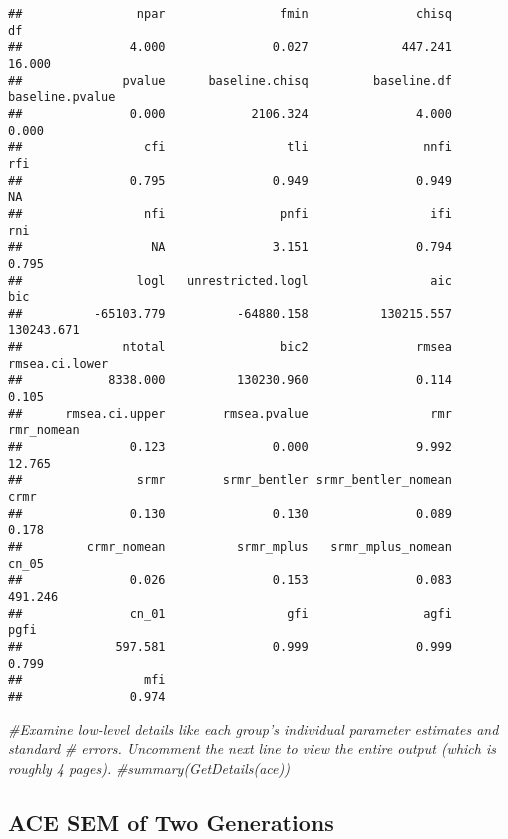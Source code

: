 \documentclass[smallextended]{svjour3}       %
\newenvironment{Shaded}{\begin{snugshade}}{\end{snugshade}}
\newcommand{\CommentTok}[1]{\textcolor[rgb]{0.56,0.35,0.01}{\textit{#1}}}
\begin{document}
\begin{verbatim}
##                npar                fmin               chisq                  df 
##               4.000               0.027             447.241              16.000 
##              pvalue      baseline.chisq         baseline.df     baseline.pvalue 
##               0.000            2106.324               4.000               0.000 
##                 cfi                 tli                nnfi                 rfi 
##               0.795               0.949               0.949                  NA 
##                 nfi                pnfi                 ifi                 rni 
##                  NA               3.151               0.794               0.795 
##                logl   unrestricted.logl                 aic                 bic 
##          -65103.779          -64880.158          130215.557          130243.671 
##              ntotal                bic2               rmsea      rmsea.ci.lower 
##            8338.000          130230.960               0.114               0.105 
##      rmsea.ci.upper        rmsea.pvalue                 rmr          rmr_nomean 
##               0.123               0.000               9.992              12.765 
##                srmr        srmr_bentler srmr_bentler_nomean                crmr 
##               0.130               0.130               0.089               0.178 
##         crmr_nomean          srmr_mplus   srmr_mplus_nomean               cn_05 
##               0.026               0.153               0.083             491.246 
##               cn_01                 gfi                agfi                pgfi 
##             597.581               0.999               0.999               0.799 
##                 mfi 
##               0.974
\end{verbatim}

\begin{Shaded}
\begin{Highlighting}[]
\CommentTok{#Examine low-level details like each group's individual parameter estimates and standard}
\CommentTok{#  errors.  Uncomment the next line to view the entire output (which is roughly 4 pages).}
\CommentTok{#summary(GetDetails(ace))}
\end{Highlighting}
\end{Shaded}

\hypertarget{ace-sem-of-two-generations}{%
\subsection{ACE SEM of Two
Generations}\label{ace-sem-of-two-generations}}
\end{document}

